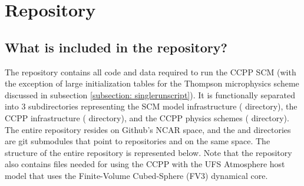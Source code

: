 \chapter{Repository}
\label{chapter: repository}

\section{What is included in the repository?}
The repository contains all code and data required to run the CCPP SCM (with the exception of large initialization tables for the Thompson microphysics scheme discussed in subsection \ref{subsection: singlerunscript}). It is functionally separated into 3 subdirectories representing the SCM model infrastructure ( directory), the CCPP infrastructure ( directory), and the CCPP physics schemes ( directory). The entire  repository resides on Github's NCAR space, and the  and  directories are git submodules that point to repositories  and  on the same space. The structure of the entire repository is represented below. Note that the  repository also contains files needed for using the CCPP with the UFS Atmosphere host model that uses the Finite-Volume Cubed-Sphere (FV3) dynamical core.

